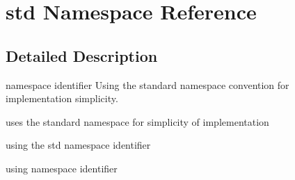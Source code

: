 \hypertarget{namespacestd}{\section{std Namespace Reference}
\label{namespacestd}
}


\subsection{Detailed Description}
namespace identifier Using the standard namespace convention for implementation simplicity.

uses the standard namespace for simplicity of implementation

using the std namespace identifier

using namespace identifier 